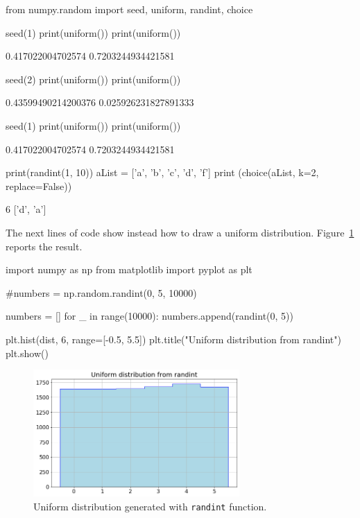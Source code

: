 \begin{ipython}
from numpy.random import seed, uniform, randint, choice

seed(1)
print(uniform())
print(uniform())
\end{ipython}
\begin{ioutput}
0.417022004702574
0.7203244934421581
\end{ioutput}
\begin{ipython}
seed(2)
print(uniform())
print(uniform())
\end{ipython}
\begin{ioutput}
0.43599490214200376
0.025926231827891333
\end{ioutput}
\begin{ipython}
seed(1)
print(uniform())
print(uniform())
\end{ipython}
\begin{ioutput}
0.417022004702574
0.7203244934421581
\end{ioutput}
\begin{ipython}
print(randint(1, 10))
aList = ['a', 'b', 'c', 'd', 'f']
print (choice(aList, k=2, replace=False))
\end{ipython}
\begin{ioutput}
6
['d', 'a']
\end{ioutput}

The next lines of code show instead how to draw a uniform distribution. Figure~\ref{fig:uniform_dist} reports the result.

\begin{ipython}
import numpy as np
from matplotlib import pyplot as plt

#numbers = np.random.randint(0, 5, 10000)

numbers = []
for _ in range(10000):
    numbers.append(randint(0, 5))

plt.hist(dist, 6, range=[-0.5, 5.5])
plt.title("Uniform distribution from randint")
plt.show()
\end{ipython}

\begin{figure}[h]
\centering
\includegraphics[width=0.7\textwidth]{figures/uniform}
\caption{Uniform distribution generated with \texttt{randint} function.}
\label{fig:uniform_dist}
\end{figure}
    
